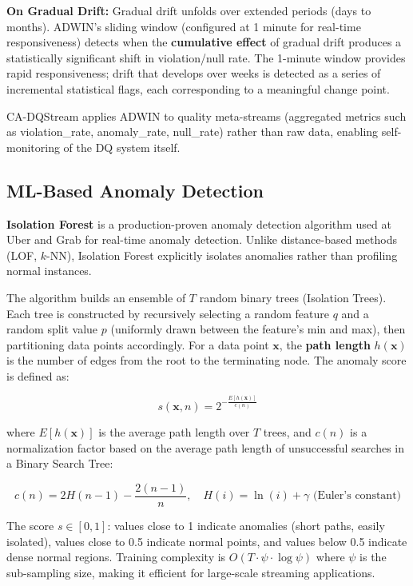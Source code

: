 \textbf{On Gradual Drift:} Gradual drift unfolds over extended periods (days to months). ADWIN's sliding window (configured at 1 minute for real-time responsiveness) detects when the \textbf{cumulative effect} of gradual drift produces a statistically significant shift in violation/null rate. The 1-minute window provides rapid responsiveness; drift that develops over weeks is detected as a series of incremental statistical flags, each corresponding to a meaningful change point.

CA-DQStream applies ADWIN to quality meta-streams (aggregated metrics such as violation\_rate, anomaly\_rate, null\_rate) rather than raw data, enabling self-monitoring of the DQ system itself.

\subsection{ML-Based Anomaly Detection}

\textbf{Isolation Forest} \citep{liu2008isolation} is a production-proven anomaly detection algorithm used at Uber and Grab for real-time anomaly detection. Unlike distance-based methods (LOF, $k$-NN), Isolation Forest explicitly isolates anomalies rather than profiling normal instances.

The algorithm builds an ensemble of $T$ random binary trees (Isolation Trees). Each tree is constructed by recursively selecting a random feature $q$ and a random split value $p$ (uniformly drawn between the feature's min and max), then partitioning data points accordingly. For a data point $\mathbf{x}$, the \textbf{path length} $h(\mathbf{x})$ is the number of edges from the root to the terminating node. The anomaly score is defined as:

\begin{equation}
s(\mathbf{x}, n) = 2^{-\frac{E[h(\mathbf{x})]}{c(n)}}
\end{equation}

where $E[h(\mathbf{x})]$ is the average path length over $T$ trees, and $c(n)$ is a normalization factor based on the average path length of unsuccessful searches in a Binary Search Tree:

\begin{equation}
c(n) = 2 H(n-1) - \frac{2(n-1)}{n}, \quad H(i) = \ln(i) + \gamma \text{ (Euler's constant)}
\end{equation}

The score $s \in [0, 1]$: values close to 1 indicate anomalies (short paths, easily isolated), values close to 0.5 indicate normal points, and values below 0.5 indicate dense normal regions. Training complexity is $O(T \cdot \psi \cdot \log \psi)$ where $\psi$ is the sub-sampling size, making it efficient for large-scale streaming applications.

